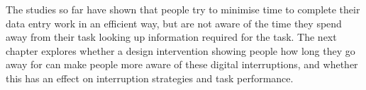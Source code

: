 The studies so far have shown that people try to minimise time to complete their data entry work in an efficient way, but are not aware of the time they spend away from their task looking up information required for the task. The next chapter explores whether a design intervention showing people how long they go away for can make people more aware of these digital interruptions, and whether this has an effect on interruption strategies and task performance.